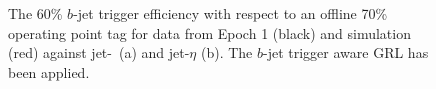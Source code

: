 \begin{figure}[!ht]
  \begin{center}
    \captionsetup[subfigure]{aboveskip=0pt,justification=centering}
  \end{center}
  \caption{The 60\% $b$-jet trigger efficiency with respect to an offline 70\% operating point tag
    for data from Epoch 1 (black) and simulation (red) against jet-\pT~(a) and jet-$\eta$ (b).
    The $b$-jet trigger aware GRL has been applied.}
  \label{fig:Epoch1_bslt2mm_eff}
\end{figure}

